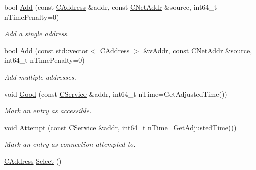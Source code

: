 \begin{DoxyCompactItemize}
\mbox{\label{class_c_addr_man_a03fcc7109b5f014760dc50a81f68c5ec}} 
bool \mbox{\hyperlink{class_c_addr_man_a03fcc7109b5f014760dc50a81f68c5ec}{Add}} (const \mbox{\hyperlink{class_c_address}{C\+Address}} \&addr, const \mbox{\hyperlink{class_c_net_addr}{C\+Net\+Addr}} \&source, int64\+\_\+t n\+Time\+Penalty=0)
\begin{DoxyCompactList}\small\item\em Add a single address. \end{DoxyCompactList}\item 
\mbox{\label{class_c_addr_man_aa2ae2abdf710b2d81fa37f072bab028e}} 
bool \mbox{\hyperlink{class_c_addr_man_aa2ae2abdf710b2d81fa37f072bab028e}{Add}} (const std\+::vector$<$ \mbox{\hyperlink{class_c_address}{C\+Address}} $>$ \&v\+Addr, const \mbox{\hyperlink{class_c_net_addr}{C\+Net\+Addr}} \&source, int64\+\_\+t n\+Time\+Penalty=0)
\begin{DoxyCompactList}\small\item\em Add multiple addresses. \end{DoxyCompactList}\item 
\mbox{\label{class_c_addr_man_a993e80e74701d7bc6bb49880c387b847}} 
void \mbox{\hyperlink{class_c_addr_man_a993e80e74701d7bc6bb49880c387b847}{Good}} (const \mbox{\hyperlink{class_c_service}{C\+Service}} \&addr, int64\+\_\+t n\+Time=Get\+Adjusted\+Time())
\begin{DoxyCompactList}\small\item\em Mark an entry as accessible. \end{DoxyCompactList}\item 
\mbox{\label{class_c_addr_man_afcddc2573121065177dc981cea710789}} 
void \mbox{\hyperlink{class_c_addr_man_afcddc2573121065177dc981cea710789}{Attempt}} (const \mbox{\hyperlink{class_c_service}{C\+Service}} \&addr, int64\+\_\+t n\+Time=Get\+Adjusted\+Time())
\begin{DoxyCompactList}\small\item\em Mark an entry as connection attempted to. \end{DoxyCompactList}\item 
\mbox{\hyperlink{class_c_address}{C\+Address}} \mbox{\hyperlink{class_c_addr_man_ae4b1b65cc15f9a12f90db362fb9c8488}{Select}} ()
\item 

\end{DoxyCompactItemize}
